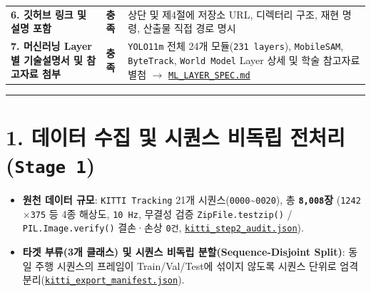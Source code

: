 \documentclass[10.5pt,a4paper]{article}
\begin{document}
\begin{footnotesize}
\begin{longtable}{>{\raggedright\arraybackslash}p{} >{\raggedright\arraybackslash}p{} >{\raggedright\arraybackslash}p{}}
\textbf{6. 깃허브 링크 및 설명 포함} & \textbf{충족} & 상단 및 제4절에 저장소 URL, 디렉터리 구조, 재현 명령, 산출물 직접 경로 명시 \\
\textbf{7. 머신러닝 Layer별 기술설명서 및 참고자료 첨부} & \textbf{충족} & \texttt{YOLO11m} 전체 24개 모듈(\texttt{231 layers}), \texttt{MobileSAM}, \texttt{ByteTrack}, \texttt{World Model} Layer 상세 및 학술 참고자료 별첨 $\rightarrow$ \href{https://github.com/Heisnotanimposter/Totalcare\_autonomous\_driving\_Yolov5/blob/main/ML\_LAYER\_SPEC.md}{\texttt{ML\_\allowbreak{}LAYER\_\allowbreak{}SPEC.\allowbreak{}md}} \\
\end{longtable}
\end{footnotesize}


\par\noindent\rule{\textwidth}{0.4pt}\par\medskip

\section{1. 데이터 수집 및 시퀀스 비독립 전처리 (\texttt{Stage 1})}

\begin{itemize}[leftmargin=1.5em,itemsep=2pt]
\item \textbf{원천 데이터 규모}: \texttt{KITTI Tracking} 21개 시퀀스(\texttt{0000}\textasciitilde{}\texttt{0020}), 총 \textbf{\texttt{8,\allowbreak{}008}장} (\texttt{1242$\times$375} 등 4종 해상도, \texttt{10 Hz}, 무결성 검증 \texttt{ZipFile.\allowbreak{}testzip()} / \texttt{PIL.\allowbreak{}Image.\allowbreak{}verify()} 결손·손상 \texttt{0건}, \href{https://github.com/Heisnotanimposter/Totalcare\_autonomous\_driving\_Yolov5/blob/main/results/v2\_improved/outputs/kitti\_step2\_audit.json}{\texttt{kitti\_\allowbreak{}step2\_\allowbreak{}audit.\allowbreak{}json}}).
\item \textbf{타겟 부류(3개 클래스) 및 시퀀스 비독립 분할(Sequence-Disjoint Split)}: 동일 주행 시퀀스의 프레임이 Train/Val/Test에 섞이지 않도록 시퀀스 단위로 엄격 분리(\href{https://github.com/Heisnotanimposter/Totalcare\_autonomous\_driving\_Yolov5/blob/main/results/v2\_improved/outputs/kitti\_export\_manifest.json}{\texttt{kitti\_\allowbreak{}export\_\allowbreak{}manifest.\allowbreak{}json}}).
\end{itemize}
\end{document}
